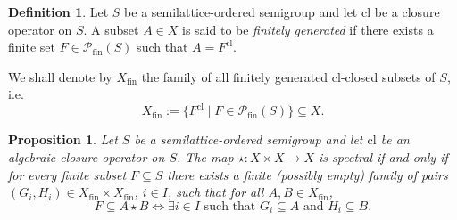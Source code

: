 \documentclass[10pt, reqno]{amsart}
\theoremstyle{plain}
\newtheorem{prop}[theorem]{Proposition}
\theoremstyle{definition}
\newtheorem{definition}[theorem]{Definition}
\begin{document}
\begin{definition}\cite{Herrmann}
    Let $S$ be a semilattice-ordered semigroup and let $\mathrm{cl}$ be a closure operator on $S$. A subset $A \in X$ is said to be \emph{finitely generated} if there exists a finite set $F \in\mathcal{P}_\mathrm{fin}(S)$ such that $A = F^\mathrm{cl}$.   
\end{definition}
We shall denote by $X_\mathrm{fin}$ the family of all finitely generated $\mathrm{cl}$-closed subsets of $S$, i.e. 
\begin{equation*}
    X_\mathrm{fin} := \{F^\mathrm{cl} \mid F \in \mathcal{P}_\mathrm{fin}(S)\} \subseteq X. 
\end{equation*}
\begin{prop}\label{spectrality_of_star_in_terms_of_finitely_generated_subsets}
    Let $S$ be a semilattice-ordered semigroup and let $\mathrm{cl}$ be an algebraic closure operator on $S$. The map $\star : X \times X \rightarrow X$ is spectral if and only if for every finite subset $F \subseteq S$ there exists a finite (possibly empty) family of pairs $(G_i, H_i) \in X_\mathrm{fin} \times X_\mathrm{fin}$, $i \in I$, such that for all $A, B\in X_\mathrm{fin}$, 
    \begin{equation}\label{criterion_for_fin}
        F \subseteq A \star B \iff \exists i\in I\text{ such that } G_i \subseteq A\text{ and } H_i \subseteq B. 
    \end{equation}
\end{prop}
\end{document}
